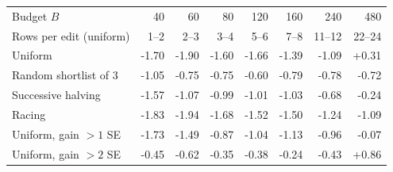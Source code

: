 \begin{tabular}{@{}lrrrrrrr@{}}
\toprule
Budget $B$ & 40 & 60 & 80 & 120 & 160 & 240 & 480 \\
Rows per edit (uniform) & 1--2 & 2--3 & 3--4 & 5--6 & 7--8 & 11--12 & 22--24 \\
\midrule
Uniform & -1.70 & -1.90 & -1.60 & -1.66 & -1.39 & -1.09 & +0.31 \\
Random shortlist of 3 & -1.05 & -0.75 & -0.75 & -0.60 & -0.79 & -0.78 & -0.72 \\
Successive halving & -1.57 & -1.07 & -0.99 & -1.01 & -1.03 & -0.68 & -0.24 \\
Racing & -1.83 & -1.94 & -1.68 & -1.52 & -1.50 & -1.24 & -1.09 \\
\midrule
Uniform, gain $>1$ SE & -1.73 & -1.49 & -0.87 & -1.04 & -1.13 & -0.96 & -0.07 \\
Uniform, gain $>2$ SE & -0.45 & -0.62 & -0.35 & -0.38 & -0.24 & -0.43 & +0.86 \\
\bottomrule
\end{tabular}
